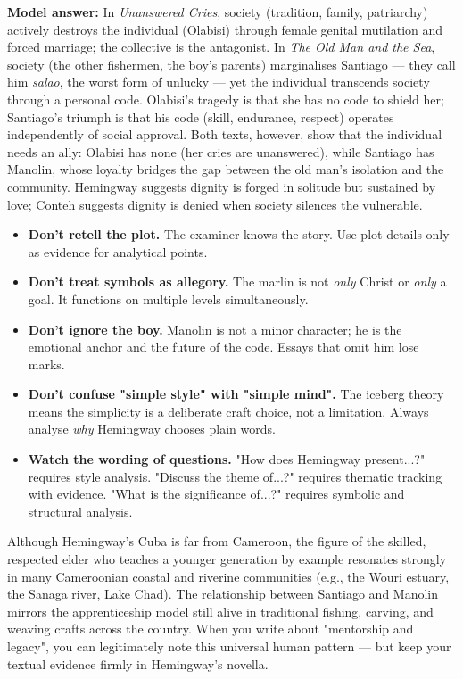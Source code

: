 \documentclass[11pt]{article}
\newcommand{\cle}[1]{{\popxbold\color{popdark}#1}}
\begin{document}
\begin{corrige}[Exercise 2]
\textbf{Model answer:} In \emph{Unanswered Cries}, society (tradition, family, patriarchy) actively destroys the individual (Olabisi) through female genital mutilation and forced marriage; the collective is the antagonist. In \emph{The Old Man and the Sea}, society (the other fishermen, the boy's parents) marginalises Santiago — they call him \emph{salao}, the worst form of unlucky — yet the individual transcends society through a personal code. Olabisi's tragedy is that she has no code to shield her; Santiago's triumph is that his code (skill, endurance, respect) operates independently of social approval. Both texts, however, show that the individual needs an ally: Olabisi has none (her cries are unanswered), while Santiago has Manolin, whose loyalty bridges the gap between the old man's isolation and the community. Hemingway suggests dignity is forged in solitude but sustained by love; Conteh suggests dignity is denied when society silences the vulnerable.
\end{corrige}

\begin{attention}
\begin{itemize}
\item \textbf{Don't retell the plot.} The examiner knows the story. Use plot details only as evidence for analytical points.
\item \textbf{Don't treat symbols as allegory.} The marlin is not \emph{only} Christ or \emph{only} a goal. It functions on multiple levels simultaneously.
\item \textbf{Don't ignore the boy.} Manolin is not a minor character; he is the emotional anchor and the future of the code. Essays that omit him lose marks.
\item \textbf{Don't confuse "simple style" with "simple mind".} The iceberg theory means the simplicity is a deliberate craft choice, not a limitation. Always analyse \emph{why} Hemingway chooses plain words.
\item \textbf{Watch the wording of questions.} "How does Hemingway present...?" requires style analysis. "Discuss the theme of...?" requires thematic tracking with evidence. "What is the significance of...?" requires symbolic and structural analysis.
\end{itemize}
\end{attention}

\begin{savaistu}
Although Hemingway's Cuba is far from Cameroon, the figure of the skilled, respected elder who teaches a younger generation by example resonates strongly in many Cameroonian coastal and riverine communities (e.g., the Wouri estuary, the Sanaga river, Lake Chad). The relationship between Santiago and Manolin mirrors the \cle{apprenticeship} model still alive in traditional fishing, carving, and weaving crafts across the country. When you write about "mentorship and legacy", you can legitimately note this universal human pattern — but keep your textual evidence firmly in Hemingway's novella.
\end{savaistu}
\end{document}

